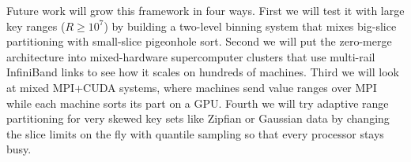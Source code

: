 \documentclass[conference]{IEEEtran}
\begin{document}
Future work will grow this framework in four ways. First we will test it with large key ranges ($R \ge 10^7$) by building a two-level binning system that mixes big-slice partitioning with small-slice pigeonhole sort. Second we will put the zero-merge architecture into mixed-hardware supercomputer clusters that use multi-rail InfiniBand links to see how it scales on hundreds of machines. Third we will look at mixed MPI+CUDA systems, where machines send value ranges over MPI while each machine sorts its part on a GPU. Fourth we will try adaptive range partitioning for very skewed key sets like Zipfian or Gaussian data by changing the slice limits on the fly with quantile sampling so that every processor stays busy.

\end{document}
